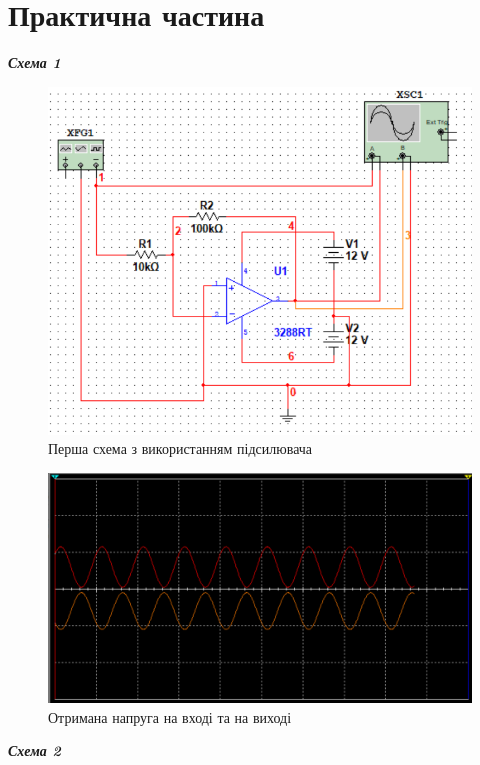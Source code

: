 \section{Практична частина}
\setlength{\parindent}{4em}
\begin{center}
  {\textbf{\emph{Схема 1}}}
\end{center}
\begin{figure}[ht]

\centering

\includegraphics[width=0.7\linewidth]{Pic/circuit_1_screen.png}

\caption{Перша схема з використанням підсилювача}

\label{Prac1}

\end{figure}
\begin{figure}[ht]

\centering

\includegraphics[width=0.7\linewidth]{Pic/circuit_1_plot.png}

\caption{Отримана напруга на вході та на виході}

\label{Prac2}

\end{figure}
\newpage
\begin{center}
  {\textbf{\emph{Схема 2}}}
\end{center}
